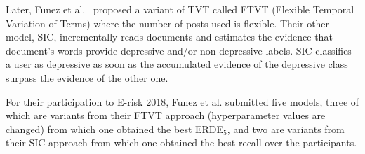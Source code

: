 \documentclass[graybox]{svmult}
\newcommand{\fr}[1]{\textcolor{brown}{#1}}
\newcommand{\jm}[1]{\textcolor{purple}{{  #1}}}
\begin{document}
Later, Funez et al.~\cite{FunezUVBCME18} proposed a variant of TVT called FTVT (Flexible Temporal Variation of Terms) where the number of posts used is flexible. Their other model, SIC, incrementally reads documents and estimates the evidence that document's words provide depressive and/or non depressive labels. SIC classifies a user as depressive as soon as the accumulated evidence of the depressive class surpass the evidence of the other one.

For their participation to E-risk 2018, Funez et al.  submitted five models, three of which are variants from their FTVT approach (hyperparameter values are changed) from which one obtained the best ERDE$_{5}$, 
and two are variants from their SIC approach from which one obtained the best recall over the participants.
\end{document}
